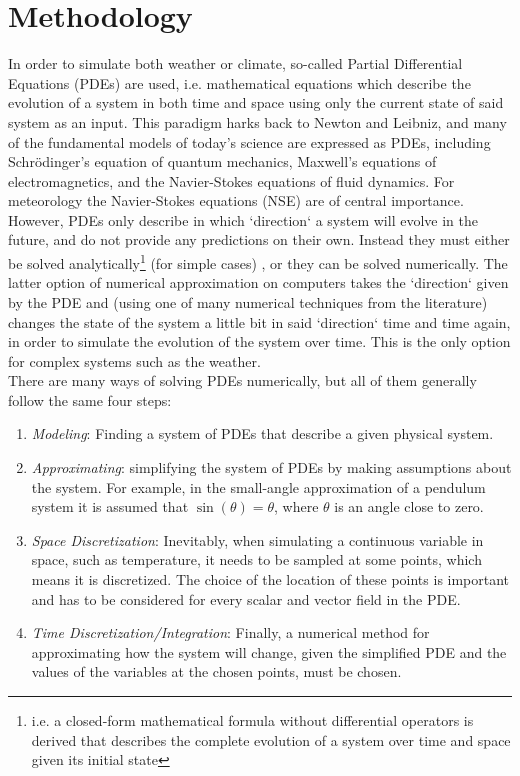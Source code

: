 \section{Methodology}
In order to simulate both weather or climate, so-called Partial Differential Equations (PDEs) are used, i.e. mathematical equations which describe the evolution of a system in both time and space using only the current state of said system as an input.
This paradigm harks back to Newton and Leibniz, and many of the fundamental models of today's science are expressed as PDEs, including Schr\"odinger's equation of quantum mechanics, Maxwell's equations of electromagnetics, and the Navier-Stokes equations of fluid dynamics.
For meteorology the Navier-Stokes equations (NSE) are of central importance.\\
However, PDEs only describe in which `direction` a system will evolve in the future, and do not provide any predictions on their own.
Instead they must either be solved analytically\footnote{i.e. a closed-form mathematical formula without differential operators is derived that describes the complete evolution of a system over time and space given its initial state} (for simple cases) , or they can be solved numerically.
The latter option of numerical approximation on computers takes the `direction` given by the PDE and (using one of many numerical techniques from the literature) changes the state of the system a little bit in said `direction` time and time again, in order to simulate the evolution of the system over time.
This is the only option for complex systems such as the weather.\\
There are many ways of solving PDEs numerically, but all of them generally follow the same four steps:
\begin{enumerate}
\item \emph{Modeling}: Finding a system of PDEs that describe a given physical system.
\item \emph{Approximating}: simplifying the system of PDEs by making assumptions about the system. For example, in the small-angle approximation of a pendulum system it is assumed that $\sin(\theta)=\theta$, where $\theta$ is an angle close to zero.
\item \emph{Space Discretization}: Inevitably, when simulating a continuous variable in space, such as temperature, it needs to be sampled at some points, which means it is discretized.
The choice of the location of these points is important and has to be considered for every scalar and vector field in the PDE.
\item \emph{Time Discretization/Integration}: Finally, a numerical method for approximating how the system will change, given the simplified PDE and the values of the variables at the chosen points, must be chosen.
\end{enumerate}
